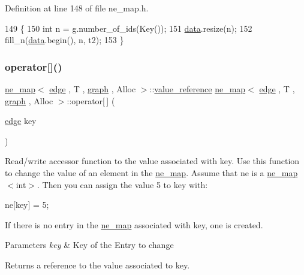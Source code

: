 Definition at line 148 of file ne\+\_\+map.\+h.


\begin{DoxyCode}
149 \{
150     \textcolor{keywordtype}{int} n = \mbox{\hyperlink{rings_8cpp_aa9df5aa3976a89a96a5f1c7611d42938}{g}}.number\_of\_ids(Key());
151     \mbox{\hyperlink{classne__map_af73307678e05a9c24c084d98b267afa8}{data}}.resize(n);
152     fill\_n(\mbox{\hyperlink{classne__map_af73307678e05a9c24c084d98b267afa8}{data}}.begin(), n, t2);
153 \}
\end{DoxyCode}
\mbox{\label{classne__map_a4bcfa7ec2dcbfaa42fab93dfa81e8ab0}} 
\subsubsection{\texorpdfstring{operator[]()}{operator[]()}\hspace{0.1cm}{\footnotesize\ttfamily [1/2]}}
{\footnotesize\ttfamily \mbox{\hyperlink{classne__map}{ne\+\_\+map}}$<$ \mbox{\hyperlink{classedge}{edge}} , T , \mbox{\hyperlink{classgraph}{graph}} , Alloc $>$\+::\mbox{\hyperlink{classne__map_a3de60750d102f8992a215b0fe645014d}{value\+\_\+reference}} \mbox{\hyperlink{classne__map}{ne\+\_\+map}}$<$ \mbox{\hyperlink{classedge}{edge}} , T , \mbox{\hyperlink{classgraph}{graph}} , Alloc $>$\+::operator\mbox{[}$\,$\mbox{]} (\begin{DoxyParamCaption}\item[{\mbox{\hyperlink{classedge}{edge}}}]{key }\end{DoxyParamCaption})\hspace{0.3cm}{\ttfamily [inherited]}}

Read/write accessor function to the value associated with {\ttfamily key}. Use this function to change the value of an element in the {\ttfamily \mbox{\hyperlink{classne__map}{ne\+\_\+map}}}. Assume that {\ttfamily ne} is a {\ttfamily \mbox{\hyperlink{classne__map}{ne\+\_\+map}}$<$int$>$}. Then you can assign the value 5 to {\ttfamily key} with\+: 
\begin{DoxyPre}
  ne[key] = 5;
\end{DoxyPre}


If there is no entry in the {\ttfamily \mbox{\hyperlink{classne__map}{ne\+\_\+map}}} associated with {\ttfamily key}, one is created.


\begin{DoxyParams}{Parameters}
{\em key} & Key of the Entry to change \\
\hline
\end{DoxyParams}
\begin{DoxyReturn}{Returns}
a reference to the value associated to {\ttfamily key}. 
\end{DoxyReturn}


